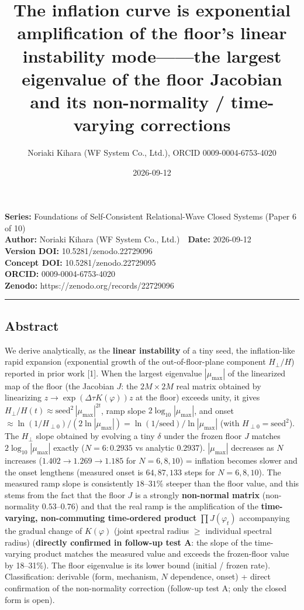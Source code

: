 \documentclass[
  a4paper,
]{ltjsarticle}
\title{The inflation curve is exponential amplification of the floor's
linear instability mode------the largest eigenvalue of the floor
Jacobian and its non-normality / time-varying corrections}
\author{Noriaki Kihara (WF System Co., Ltd.), ORCID 0009-0004-6753-4020}
\date{2026-09-12}
\begin{document}
\maketitle

\textbf{Series:} Foundations of Self-Consistent Relational-Wave Closed
Systems (Paper 6 of 10)\\
\textbf{Author:} Noriaki Kihara (WF System Co., Ltd.)　\textbf{Date:}
2026-09-12\\
\textbf{Version DOI:} 10.5281/zenodo.22729096\\
\textbf{Concept DOI:} 10.5281/zenodo.22729095\\
\textbf{ORCID:} 0009-0004-6753-4020\\
\textbf{Zenodo:} https://zenodo.org/records/22729096\\

\begin{center}\rule{0.5\linewidth}{0.5pt}\end{center}

\subsection{Abstract}\label{abstract}

We derive analytically, as the \textbf{linear instability} of a tiny
seed, the inflation-like rapid expansion (exponential growth of the
out-of-floor-plane component \(H_\perp/H\)) reported in prior work
{[}1{]}. When the largest eigenvalue \(|\mu_{\max}|\) of the linearized
map of the floor (the Jacobian \(J\): the \(2M\times2M\) real matrix
obtained by linearizing \(z\to\exp(\Delta\tau K(\varphi))z\) at the
floor) exceeds unity, it gives
\(H_\perp/H(t)\approx\text{seed}^2\,|\mu_{\max}|^{2t}\), ramp slope
\(2\log_{10}|\mu_{\max}|\), and onset
\(\approx\ln(1/H_{\perp0})/(2\ln|\mu_{\max}|)=\ln(1/\text{seed})/\ln|\mu_{\max}|\)
(with \(H_{\perp0}=\text{seed}^2\)). The \(H_\perp\) slope obtained by
evolving a tiny \(\delta\) under the frozen floor \(J\) matches
\(2\log_{10}|\mu_{\max}|\) exactly (\(N=6{:}0.2935\) vs analytic
\(0.2937\)). \(|\mu_{\max}|\) decreases as \(N\) increases
(\(1.402\to1.269\to1.185\) for \(N=6,8,10\)) = inflation becomes slower
and the onset lengthens (measured onset is \(64,87,133\) steps for
\(N=6,8,10\)). The measured ramp slope is consistently \(18\)--\(31\%\)
steeper than the floor value, and this stems from the fact that the
floor \(J\) is a strongly \textbf{non-normal matrix} (non-normality
\(0.53\)--\(0.76\)) and that the real ramp is the amplification of the
\textbf{time-varying, non-commuting time-ordered product}
\(\prod J(\varphi_t)\) accompanying the gradual change of \(K(\varphi)\)
(joint spectral radius \(\ge\) individual spectral radius)
(\textbf{directly confirmed in follow-up test A}: the slope of the
time-varying product matches the measured value and exceeds the
frozen-floor value by 18--31\%). The floor eigenvalue is its lower bound
(initial / frozen rate). Classification: derivable (form, mechanism,
\(N\) dependence, onset) + direct confirmation of the non-normality
correction (follow-up test A; only the closed form is open).
\end{document}
